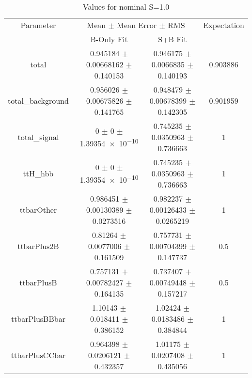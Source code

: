 \begin{table}
\centering
\caption{Values for nominal S=1.0}
\begin{tabular}{cccc}
\toprule
Parameter & \multicolumn{2}{c}{Mean $\pm$ Mean Error $\pm$ RMS} & Expectation\\
 & B-Only Fit & S+B Fit & \\
\midrule
total & \num{0.945184} $\pm$ \num{0.00668162} $\pm$ \num{0.140153} & \num{0.946175} $\pm$ \num{0.0066835} $\pm$ \num{0.140193} & \num{0.903886}\\
total\_background & \num{0.956026} $\pm$ \num{0.00675826} $\pm$ \num{0.141765} & \num{0.948479} $\pm$ \num{0.00678399} $\pm$ \num{0.142305} & \num{0.901959}\\
total\_signal & \num{0} $\pm$ \num{0} $\pm$ \num{1.39354e-10} & \num{0.745235} $\pm$ \num{0.0350963} $\pm$ \num{0.736663} & \num{1}\\
ttH\_hbb & \num{0} $\pm$ \num{0} $\pm$ \num{1.39354e-10} & \num{0.745235} $\pm$ \num{0.0350963} $\pm$ \num{0.736663} & \num{1}\\
ttbarOther & \num{0.986451} $\pm$ \num{0.00130389} $\pm$ \num{0.0273516} & \num{0.982237} $\pm$ \num{0.00126433} $\pm$ \num{0.0265219} & \num{1}\\
ttbarPlus2B & \num{0.81264} $\pm$ \num{0.0077006} $\pm$ \num{0.161509} & \num{0.757731} $\pm$ \num{0.00704399} $\pm$ \num{0.147737} & \num{0.5}\\
ttbarPlusB & \num{0.757131} $\pm$ \num{0.00782427} $\pm$ \num{0.164135} & \num{0.737407} $\pm$ \num{0.00749448} $\pm$ \num{0.157217} & \num{0.5}\\
ttbarPlusBBbar & \num{1.10143} $\pm$ \num{0.018411} $\pm$ \num{0.386152} & \num{1.02424} $\pm$ \num{0.0183486} $\pm$ \num{0.384844} & \num{1}\\
ttbarPlusCCbar & \num{0.964398} $\pm$ \num{0.0206121} $\pm$ \num{0.432357} & \num{1.01175} $\pm$ \num{0.0207408} $\pm$ \num{0.435056} & \num{1}\\
\bottomrule
\end{tabular}
\end{table}